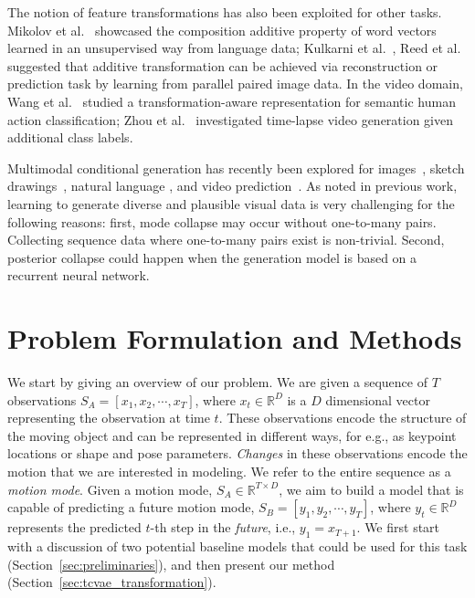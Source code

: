 \documentclass[runningheads]{llncs}
\newcommand{\cutsectionup}{\vspace*{-0.2in}}
\newcommand{\cutsectiondown}{\vspace*{-0.12in}}
\begin{document}
The notion of feature transformations has also been exploited for other tasks. Mikolov et al.~\cite{mikolov2013distributed} showcased the composition additive property of word vectors learned in an unsupervised way from language data;
Kulkarni et al.~\cite{kulkarni2015deep}, Reed et al.~\cite{reed2015deep} suggested that additive transformation can be achieved via reconstruction or prediction task by learning from parallel paired image data.
In the video domain, Wang et al.~\cite{wang2016actions} studied a transformation-aware representation for semantic human action classification;
Zhou et al.~\cite{zhou2016learning} investigated time-lapse video generation given additional class labels.

Multimodal conditional generation has recently been explored for images~\cite{sohn2015learning,zhu2017toward}, sketch drawings~\cite{ha2017neural}, natural language \cite{bowman2015generating,hu2017controllable}, and video prediction~\cite{mohammad2018stochastic,denton2018stochastic}.
As noted in previous work, learning to generate diverse and plausible visual data is very challenging for the following reasons:
first, mode collapse may occur without one-to-many pairs. Collecting sequence data where one-to-many pairs exist is non-trivial.
Second, posterior collapse could happen when the generation model is based on a recurrent neural network.


\cutsectionup
\section{Problem Formulation and Methods}
\cutsectiondown
We start by giving an overview of our problem.
We are given a sequence of $T$ observations $S_A = [x_1, x_2, \cdots, x_T]$, where $x_t \in \mathbb{R}^{D}$ is a $D$ dimensional vector representing the observation at time $t$.
These observations encode the structure of the moving object and can be represented in different ways, for e.g., as keypoint locations or shape and pose parameters. 
\emph{Changes} in these observations encode the motion that we are interested in modeling.
We refer to the entire sequence as a \emph{motion mode}.
Given a motion mode, $S_A \in \mathbb{R}^{T \times D}$, we aim to build a model that is capable of predicting a future motion mode, $S_B = [y_1, y_2, \cdots, y_T] $, where $y_t \in \mathbb{R}^{D}$ represents the predicted $t$-th step in the \emph{future}, i.e., $y_1 = x_{T+1}$. 
We first start with a discussion of two potential baseline models that could be used for this task (Section~\ref{sec:preliminaries}), and then present our method (Section~\ref{sec:tcvae_transformation}).
\end{document}
